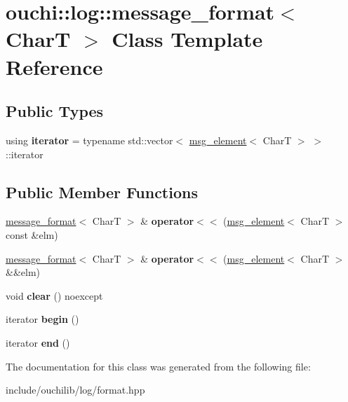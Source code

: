 \hypertarget{classouchi_1_1log_1_1message__format}{}\section{ouchi\+::log\+::message\+\_\+format$<$ CharT $>$ Class Template Reference}
\label{classouchi_1_1log_1_1message__format}
\subsection*{Public Types}
\begin{DoxyCompactItemize}
\item 
\mbox{\label{classouchi_1_1log_1_1message__format_a551597143cbc76387ab158c5f3929327}} 
using {\bfseries iterator} = typename std\+::vector$<$ \mbox{\hyperlink{classouchi_1_1log_1_1msg__element}{msg\+\_\+element}}$<$ CharT $>$ $>$\+::iterator
\end{DoxyCompactItemize}
\subsection*{Public Member Functions}
\begin{DoxyCompactItemize}
\item 
\mbox{\label{classouchi_1_1log_1_1message__format_a4519f6871a72095aa8d051cd6321c1ff}} 
\mbox{\hyperlink{classouchi_1_1log_1_1message__format}{message\+\_\+format}}$<$ CharT $>$ \& {\bfseries operator$<$$<$} (\mbox{\hyperlink{classouchi_1_1log_1_1msg__element}{msg\+\_\+element}}$<$ CharT $>$ const \&elm)
\item 
\mbox{\label{classouchi_1_1log_1_1message__format_a4654cfc43866d2e8459e566856b5d862}} 
\mbox{\hyperlink{classouchi_1_1log_1_1message__format}{message\+\_\+format}}$<$ CharT $>$ \& {\bfseries operator$<$$<$} (\mbox{\hyperlink{classouchi_1_1log_1_1msg__element}{msg\+\_\+element}}$<$ CharT $>$ \&\&elm)
\item 
\mbox{\label{classouchi_1_1log_1_1message__format_a0def6d8aac3e29d4ed75aee678e32df1}} 
void {\bfseries clear} () noexcept
\item 
\mbox{\label{classouchi_1_1log_1_1message__format_a4fdc6c02a0532fb2e71c5f5f938b88a9}} 
iterator {\bfseries begin} ()
\item 
\mbox{\label{classouchi_1_1log_1_1message__format_aecd84311acdd0672e9a118a7ad979912}} 
iterator {\bfseries end} ()
\end{DoxyCompactItemize}


The documentation for this class was generated from the following file\+:\begin{DoxyCompactItemize}
\item 
include/ouchilib/log/format.\+hpp\end{DoxyCompactItemize}
